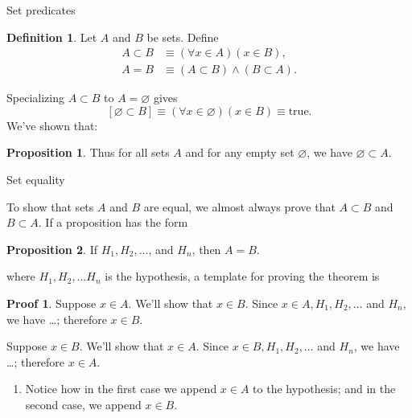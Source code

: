 \documentclass[fleqn]{beamer}
\theoremstyle{definition}
\newtheorem{mydef}{Definition}
\newtheorem{myth}{Proposition}
\newtheorem{myproof}{Proof}
\begin{document}
\begin{frame}{Set predicates}

\begin{mydef}
Let \(A\) and \(B\) be sets. Define
\begin{align*}
   A \subset B &\equiv (\forall x \in A)(x \in B),\\
   A = B &\equiv  (A \subset B) \land (B \subset A).
\end{align*}
\end{mydef}

Specializing \(A \subset B\) to \(A = \varnothing\) gives
\[
   \left[\varnothing \subset B \right] \equiv  (\forall x \in \varnothing)(x \in B) \equiv \mbox{true}.
\]
We've shown that:

\begin{myth} Thus for all sets \(A\) and for any empty set \(\varnothing\), we have \(\varnothing \subset A\).  \end{myth}


\end{frame}

\begin{frame}{Set equality}

To show that sets \(A\) and \(B\) are equal, we almost always prove that \(A \subset B\) and \(B \subset A\).  If a proposition has the form

\begin{myth} If \(H_1, H_2, \dots\), and \( H_n\), then \(A = B\). \end{myth}

where  \(H_1, H_2, \dots H_n\) is the hypothesis, a template for proving the theorem is
\begin{myproof} Suppose \(x \in A\).  We'll show that \(x \in B\).  Since  \(x \in A, H_1, H_2, \dots\) and \( H_n\),  we have \dots; therefore \(x \in B\).

\quad Suppose \(x \in B\).  We'll show that \(x \in A\).  Since  \(x \in B, H_1, H_2, \dots\) and  \(H_n\),  we have \dots; therefore \(x \in A\).

\end{myproof}

\begin{enumerate}

\item Notice how in the first case we append \(x \in A\) to the hypothesis; and in the second case, we append \(x \in B\).
\end{enumerate}

\end{frame}
\end{document}

